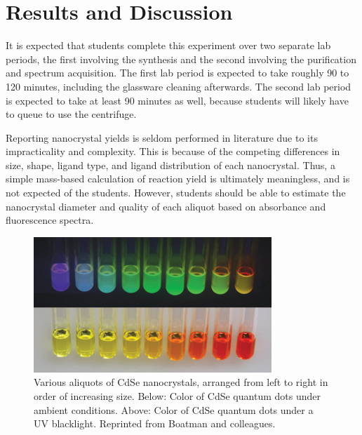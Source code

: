 \documentclass[journal = jceda8, manuscript = article]{achemso}
\begin{document}
\section{Results and Discussion}


It is expected that students complete this experiment over two separate lab
periods, the first involving the synthesis and the second involving the
purification and spectrum acquisition. The first lab period is expected to take
roughly 90 to 120 minutes, including the glassware cleaning afterwards. The
second lab period is expected to take at least 90 minutes as well, because
students will likely have to queue to use the centrifuge.

Reporting nanocrystal yields is seldom performed in literature due to its
impracticality and complexity. This is because of the competing differences in
size, shape, ligand type, and ligand distribution of each nanocrystal. Thus, a
simple mass-based calculation of reaction yield is ultimately meaningless, and
is not expected of the students. However, students should be able to estimate
the nanocrystal diameter and quality of each aliquot based on absorbance and
fluorescence spectra.

\begin{figure}[H]
	\includegraphics[width=0.8\textwidth]{./figures/colors.png}
	\caption{Various aliquots of CdSe nanocrystals, arranged from left to
	right in order of increasing size. Below: Color of CdSe quantum dots under
ambient conditions. Above: Color of CdSe quantum dots under a UV blacklight.
Reprinted from Boatman and colleagues. \cite{jce-2}}
\end{figure}
\end{document}
